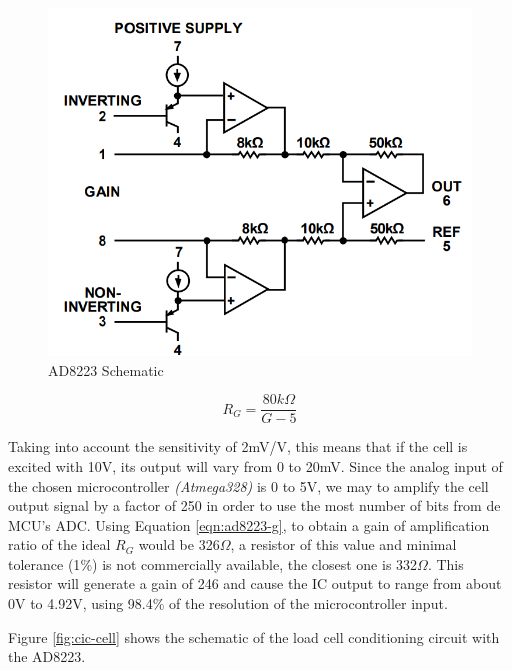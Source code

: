 		\begin{figure}[htbp]
			\centering
				\includegraphics[scale=0.65]{figuras/fig-ad8223-functional-block.png}
			\caption{AD8223 Schematic \cite{ad8223-datasheet}}
			\label{fig:ad8223-schematic}
		\end{figure}

		\begin{equation}\label{eqn:ad8223-g}
			R_{G}=\frac{80k\Omega}{G - 5}
		\end{equation}

		Taking into account the sensitivity of 2mV/V, this means that if the cell is excited with 10V, its output will vary from 0 to 20mV. Since the analog input of the chosen microcontroller \textit{(Atmega328)} is 0 to 5V, we may to amplify the cell output signal by a factor of 250 in order to use the most number of bits from de MCU's ADC. Using Equation \ref{eqn:ad8223-g}, to obtain a gain of amplification ratio of the ideal $R_{G}$ would be 326$\Omega$, a resistor of this value and minimal tolerance (1$\%$) is not commercially available, the closest one is 332$\Omega$. This resistor will generate a gain of 246 and cause the IC output to range from about 0V to 4.92V, using 98.4\% of the resolution of the microcontroller input. 
		\par

		Figure \ref{fig:cic-cell} shows the schematic of the load cell conditioning circuit with the AD8223.

